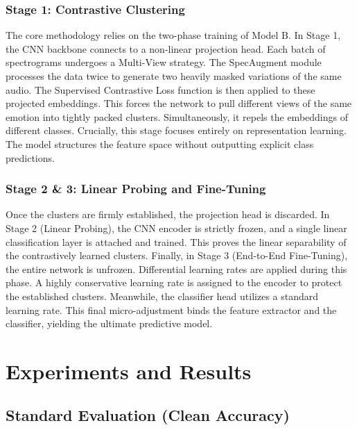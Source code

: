 \documentclass[12pt,hitec]{report}
\begin{document}
\subsubsection{Stage 1: Contrastive Clustering}
The core methodology relies on the two-phase training of Model B. In Stage 1, the CNN backbone connects to a non-linear projection head. Each batch of spectrograms undergoes a Multi-View strategy. The SpecAugment module processes the data twice to generate two heavily masked variations of the same audio. The Supervised Contrastive Loss function is then applied to these projected embeddings. This forces the network to pull different views of the same emotion into tightly packed clusters. Simultaneously, it repels the embeddings of different classes. Crucially, this stage focuses entirely on representation learning. The model structures the feature space without outputting explicit class predictions.


\subsubsection{Stage 2 \& 3: Linear Probing and Fine-Tuning}
Once the clusters are firmly established, the projection head is discarded. In Stage 2 (Linear Probing), the CNN encoder is strictly frozen, and a single linear classification layer is attached and trained. This proves the linear separability of the contrastively learned clusters. Finally, in Stage 3 (End-to-End Fine-Tuning), the entire network is unfrozen. Differential learning rates are applied during this phase. A highly conservative learning rate is assigned to the encoder to protect the established clusters. Meanwhile, the classifier head utilizes a standard learning rate. This final micro-adjustment binds the feature extractor and the classifier, yielding the ultimate predictive model.



\section{Experiments and Results}

\subsection{Standard Evaluation (Clean Accuracy)}
\end{document}
